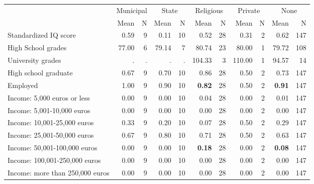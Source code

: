 \begin{tabular}{l r r r r r r r r r r}
\toprule
& \multicolumn{2}{c}{Municipal} & \multicolumn{2}{c}{State} & \multicolumn{2}{c}{Religious} & \multicolumn{2}{c}{Private} & \multicolumn{2}{c}{None} \\
& \scriptsize Mean & \scriptsize N & \scriptsize Mean & \scriptsize N & \scriptsize Mean & \scriptsize N & \scriptsize Mean & \scriptsize N & \scriptsize Mean & \scriptsize N \\
\midrule
Standardized IQ score &      0.59 &         9 &      0.11 &        10 &      0.52 &        28 &      0.31 &         2 &      0.62 &       147 \\
High School grades &     77.00 &         6 &     79.14 &         7 &     80.74 &        23 &     80.00 &         1 &     79.72 &       108 \\
University grades &         . & . &         . & . &    104.33 &         3 &    110.00 &         1 &     94.57 &        14 \\
High school graduate &      0.67 &         9 &      0.70 &        10 &      0.86 &        28 &      0.50 &         2 &      0.73 &       147 \\
Employed &      1.00 &         9 &      0.90 &        10 & \textbf{     0.82} &        28 &      0.50 &         2 & \textbf{     0.91} &       147 \\
Income: 5,000 euros or less &      0.00 &         9 &      0.00 &        10 &      0.04 &        28 &      0.00 &         2 &      0.01 &       147 \\
Income: 5,001-10,000 euros &      0.00 &         9 &      0.00 &        10 &      0.00 &        28 &      0.00 &         2 &      0.00 &       147 \\
Income: 10,001-25,000 euros &      0.33 &         9 &      0.20 &        10 &      0.07 &        28 &      0.50 &         2 &      0.29 &       147 \\
Income: 25,001-50,000 euros &      0.67 &         9 &      0.80 &        10 &      0.71 &        28 &      0.50 &         2 &      0.63 &       147 \\
Income: 50,001-100,000 euros &      0.00 &         9 &      0.00 &        10 & \textbf{     0.18} &        28 &      0.00 &         2 & \textbf{     0.08} &       147 \\
Income: 100,001-250,000 euros &      0.00 &         9 &      0.00 &        10 &      0.00 &        28 &      0.00 &         2 &      0.00 &       147 \\
Income: more than 250,000 euros &      0.00 &         9 &      0.00 &        10 &      0.00 &        28 &      0.00 &         2 &      0.00 &       147 \\

\end{tabular}
